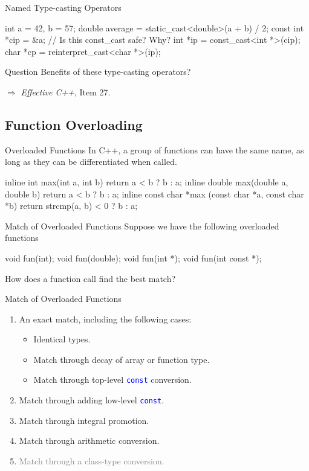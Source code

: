\documentclass{beamer}
\newcommand{\blue}[1]{\textcolor{blue}{#1}}
\newcommand{\gray}[1]{\textcolor{gray}{#1}}
\newcommand{\ttt}[1]{\texttt{#1}}
\newcommand{\bluett}[1]{\blue{\ttt{#1}}}
\newenvironment{question}{\begin{alertblock}{Question}}{\end{alertblock}}
\theoremstyle{definition}
\begin{document}
\begin{frame}[fragile]{Named Type-casting Operators}
    \begin{cpp}
int a = 42, b = 57;
double average = static_cast<double>(a + b) / 2;
const int *cip = &a;
// Is this const_cast safe? Why?
int *ip = const_cast<int *>(cip);
char *cp = reinterpret_cast<char *>(ip);
    \end{cpp}
    \pause
    \begin{question}
        Benefits of these type-casting operators?
    \end{question}
    \pause
    \(\Rightarrow\) \textit{Effective C++}, Item 27.
\end{frame}

\subsection{Function Overloading}

\begin{frame}[fragile]{Overloaded Functions}
    In C++, a group of functions can have the same name, as long as they can be differentiated when called.
    \begin{cpp}
inline int max(int a, int b) {
  return a < b ? b : a;
}
inline double max(double a, double b) {
  return a < b ? b : a;
}
inline const char *max
    (const char *a, const char *b) {
  return strcmp(a, b) < 0 ? b : a;
}
    \end{cpp}
\end{frame}

\begin{frame}[fragile]{Match of Overloaded Functions}
    Suppose we have the following overloaded functions
    \begin{cpp}
void fun(int);
void fun(double);
void fun(int *);
void fun(int const *);
    \end{cpp}
    How does a function call find the best match?
\end{frame}

\begin{frame}{Match of Overloaded Functions}
    \begin{enumerate}
        \item An exact match, including the following cases:
        \begin{itemize}
            \item Identical types.
            \item Match through decay of array or function type.
            \item Match through top-level \bluett{const} conversion.
        \end{itemize}
        \item Match through adding low-level \bluett{const}.
        \item Match through integral promotion.
        \item Match through arithmetic conversion.
        \item \gray{Match through a class-type conversion.}
    \end{enumerate}
\end{frame}
\end{document}
